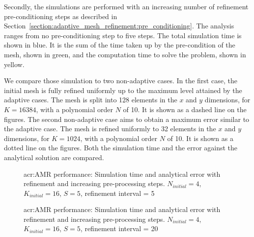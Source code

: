 Secondly, the simulations are performed with an increasing number of refinement pre-conditioning
steps as described in Section~\ref{section:adaptive_mesh_refinement:pre_conditioning}. The analysis
ranges from no pre-conditioning step to five steps. The total simulation time is shown in blue. It
is the sum of the time taken up by the pre-condition of the mesh, shown in green, and the
computation time to solve the problem, shown in yellow. 

We compare those simulation to two non-adaptive cases. In the first case, the initial mesh is fully
refined uniformly up to the maximum level attained by the adaptive cases. The mesh is split into 128
elements in the \(x\) and \(y\) dimensions, for \(K = 16384\), with a polynomial order \(N\) of 10.
It is shown as a dashed line on the figures. The second non-adaptive case aims to obtain a maximum
error similar to the adaptive case. The mesh is refined uniformly to 32 elements in the \(x\) and
\(y\) dimensions, for \(K = 1024\), with a polynomial order \(N\) of 10. It is shown as a dotted
line on the figures. Both the simulation time and the error against the analytical solution
are compared.


\begin{figure}[H]
	\centering
	\caption{\Acrlong{acr:AMR} performance: Simulation time and analytical error with refinement and increasing pre-processing steps. \(N_{initial} = 4\), \(K_{initial} = 16\), \(S = 5\), refinement interval = 5}\label{fig:adaptivity_efficiency_A5}
\end{figure}

\begin{figure}[H]
	\centering
	\hfill
	\caption{\Acrlong{acr:AMR} performance: Simulation time and analytical error with refinement and increasing pre-processing steps. \(N_{initial} = 4\), \(K_{initial} = 16\), \(S = 5\), refinement interval = 20}\label{fig:adaptivity_efficiency_A20}
\end{figure}

